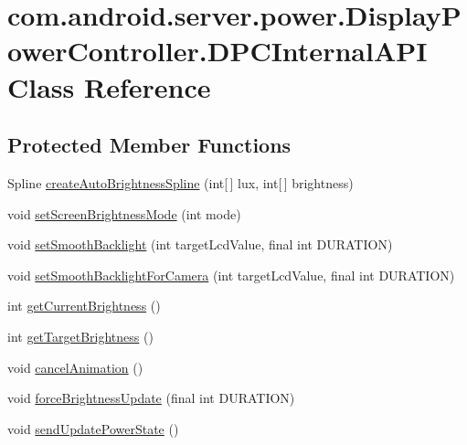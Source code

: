 \hypertarget{classcom_1_1android_1_1server_1_1power_1_1DisplayPowerController_1_1DPCInternalAPI}{\section{com.\-android.\-server.\-power.\-Display\-Power\-Controller.\-D\-P\-C\-Internal\-A\-P\-I Class Reference}
\label{classcom_1_1android_1_1server_1_1power_1_1DisplayPowerController_1_1DPCInternalAPI}
}
\subsection*{Protected Member Functions}
\begin{DoxyCompactItemize}
\item 
Spline \hyperlink{classcom_1_1android_1_1server_1_1power_1_1DisplayPowerController_1_1DPCInternalAPI_af719f1a4336338deff5689d39b774de6}{create\-Auto\-Brightness\-Spline} (int\mbox{[}$\,$\mbox{]} lux, int\mbox{[}$\,$\mbox{]} brightness)
\item 
void \hyperlink{classcom_1_1android_1_1server_1_1power_1_1DisplayPowerController_1_1DPCInternalAPI_a032004c23af272b086e9e5065e2447a5}{set\-Screen\-Brightness\-Mode} (int mode)
\item 
void \hyperlink{classcom_1_1android_1_1server_1_1power_1_1DisplayPowerController_1_1DPCInternalAPI_a3f131569d69c142341d26721af798574}{set\-Smooth\-Backlight} (int target\-Lcd\-Value, final int D\-U\-R\-A\-T\-I\-O\-N)
\item 
void \hyperlink{classcom_1_1android_1_1server_1_1power_1_1DisplayPowerController_1_1DPCInternalAPI_ab728f21a885e0c376a7f86406024fd87}{set\-Smooth\-Backlight\-For\-Camera} (int target\-Lcd\-Value, final int D\-U\-R\-A\-T\-I\-O\-N)
\item 
int \hyperlink{classcom_1_1android_1_1server_1_1power_1_1DisplayPowerController_1_1DPCInternalAPI_a0abf8f35bf3eaf286550fb4c4b8fa7bc}{get\-Current\-Brightness} ()
\item 
int \hyperlink{classcom_1_1android_1_1server_1_1power_1_1DisplayPowerController_1_1DPCInternalAPI_a4befd48a2deb6b135f55023cc34af003}{get\-Target\-Brightness} ()
\item 
void \hyperlink{classcom_1_1android_1_1server_1_1power_1_1DisplayPowerController_1_1DPCInternalAPI_a477f8db4ee8812198a20317c9bd8bb4f}{cancel\-Animation} ()
\item 
void \hyperlink{classcom_1_1android_1_1server_1_1power_1_1DisplayPowerController_1_1DPCInternalAPI_ad6c47e948ab63bc51cb6bbbf8331783e}{force\-Brightness\-Update} (final int D\-U\-R\-A\-T\-I\-O\-N)
\item 
void \hyperlink{classcom_1_1android_1_1server_1_1power_1_1DisplayPowerController_1_1DPCInternalAPI_a09aab6ed7aac7d7162bcac97e12da3fe}{send\-Update\-Power\-State} ()
\end{DoxyCompactItemize}
